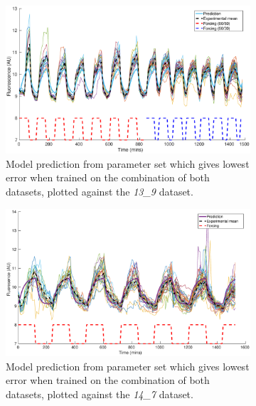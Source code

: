 \documentclass[10pt,journal]{./IEEE_latex_class/IEEEtran}
\begin{document}
\begin{figure}[H]
    \begin{subfigure}[c]{\textwidth}
    \centering
        \includegraphics[scale = 0.3]{13_9_14_7_with_13_9_bestplot}
        \caption{Model prediction from parameter set which gives lowest error when trained on the combination of both datasets, plotted against the  \textit{13\_9} dataset. }
    \end{subfigure}
    
    \begin{subfigure}[c]{\textwidth}
    \centering
        \includegraphics[scale = 0.3]{13_9_14_7_with_14_7_bestplot}
        \caption{Model prediction from parameter set which gives lowest error when trained on the combination of both datasets, plotted against the  \textit{14\_7} dataset.}
    \end{subfigure}
    \caption{}
\label{hist_f}
\end{figure}
\end{document}
